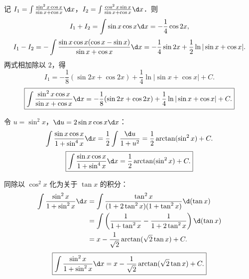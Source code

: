 \begin{solution}

    记 $I_1 = \int \frac{\sin^2 x \cos x}{\sin x + \cos x} \d x$，$I_2 = \int \frac{\cos^2 x \sin x}{\sin x + \cos x} \d x$．则
    \begin{equation}
        I_1 + I_2 = \int \sin x \cos x \d x = -\frac{1}{4}\cos 2x,
    \end{equation}
    \begin{equation}
        I_1 - I_2 = -\int \frac{\sin x \cos x (\cos x - \sin x)}{\sin x + \cos x} \d x = -\frac{1}{4}\sin 2x + \frac{1}{2}\ln|\sin x + \cos x|.
    \end{equation}
    两式相加除以 $2$，得
    \begin{equation}
        I_1 = -\frac{1}{8}(\sin 2x + \cos 2x) + \frac{1}{4}\ln|\sin x + \cos x| + C.
    \end{equation}
    \begin{equation}
        \boxed{\int \frac{\sin^2 x \cos x}{\sin x + \cos x} \d x = -\frac{1}{8}(\sin 2x + \cos 2x) + \frac{1}{4}\ln|\sin x + \cos x| + C.}
    \end{equation}


    令 $u = \sin^2 x$，$\d u = 2\sin x \cos x \d x$：
    \begin{equation}
        \int \frac{\sin x \cos x}{1 + \sin^4 x} \d x = \frac{1}{2}\int \frac{\d u}{1 + u^2} = \frac{1}{2}\arctan(\sin^2 x) + C.
    \end{equation}
    \begin{equation}
        \boxed{\int \frac{\sin x \cos x}{1 + \sin^4 x} \d x = \frac{1}{2}\arctan(\sin^2 x) + C.}
    \end{equation}


    同除以 $\cos^2 x$ 化为关于 $\tan x$ 的积分：
    \begin{equation}
        \begin{aligned}
            \int \frac{\sin^2 x}{1 + \sin^2 x} \d x & = \int \frac{\tan^2 x}{(1 + 2\tan^2 x)(1 + \tan^2 x)} \d(\tan x)                  \\
                                                    & = \int \left( \frac{1}{1 + \tan^2 x} - \frac{1}{1 + 2\tan^2 x} \right) \d(\tan x) \\
                                                    & = x - \frac{1}{\sqrt{2}}\arctan(\sqrt{2}\tan x) + C.
        \end{aligned}
    \end{equation}
    \begin{equation}
        \boxed{\int \frac{\sin^2 x}{1 + \sin^2 x} \d x = x - \frac{1}{\sqrt{2}}\arctan(\sqrt{2}\tan x) + C.}
    \end{equation}


\end{solution}
